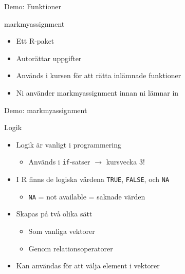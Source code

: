\documentclass[
  10pt,
  ignorenonframetext,
]{beamer}
\providecommand{\tightlist}{%
  \setlength{\itemsep}{0pt}\setlength{\parskip}{0pt}}
\begin{document}

\begin{frame}{Demo: Funktioner}

\end{frame}


\begin{frame}{markmyassignment}
\protect\hypertarget{markmyassignment-i-r}{}
\begin{itemize}
\tightlist
\item
  Ett R-paket
\item
  Autorättar uppgifter
\item
  Används i kursen för att rätta inlämnade funktioner
\item
  Ni använder markmyassignment innan ni lämnar in 
\end{itemize}
\end{frame}


\begin{frame}{Demo: markmyassignment}

\end{frame}




\begin{frame}{Logik}
\protect\hypertarget{logik}{}
\begin{itemize}
\tightlist
\item
  Logik är vanligt i programmering

  \begin{itemize}
  \tightlist
  \item
    Används i \texttt{if}-satser $\rightarrow$ kursvecka 3!
  \end{itemize}
\item
  I R finns de logiska värdena \texttt{TRUE}, \texttt{FALSE}, och
  \texttt{NA}
  \begin{itemize}
  \tightlist
  \item
    \texttt{NA} = not available = saknade värden
  \end{itemize}
\item
  Skapas på två olika sätt

  \begin{itemize}
  \tightlist
  \item
    Som vanliga vektorer
  \item
    Genom relationsoperatorer
  \end{itemize}
\item
  Kan användas för att välja element i vektorer
\end{itemize}
\end{frame}
\end{document}
